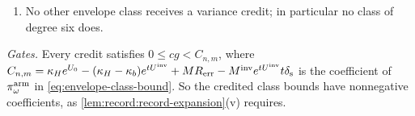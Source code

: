 \begin{lemma}
\begin{enumerate}[label=(\alph*)]
 respectively all matching records equal; weight $2^{1-4}$), $c$ is the cap of the
 envelope on these words, $\kappa_{4,F}:=\kappa_H(\mathrm{F4E0})$ and $\kappa_{4,E}$ the invariant
 cap of the aligned group of E4, and $g=g^{\rm sel}_T(m)$, $T\in\{F,E\}$. A quartic class
 whose envelope is discarded would instead keep the full-norm credit, through
 $-\prod_\Blk\gamma_\Blk\bigotimes_\Blk(I-\Jproj_\Blk)\preceq\bigotimes_\Blk\Delta_\Blk\preceq \prod_\Blk\gamma_\Blk\bigotimes_\Blk(I-\Jproj_\Blk)$, where $\Jproj_\Blk$ is the projection onto constants in the actual half space at $\Blk$, for the centred differences $\Delta_\Blk$ of norms
 $\gamma_\Blk$ (\cref{lem:record:variance-interface}); the two alternatives are never added.
 In the construction neither quartic envelope is discarded.
\item No other envelope class receives a variance credit; in particular no class of
 degree six does.
\end{enumerate}
\emph{Gates.} Every credit satisfies $0\le cg<C_{n,m}$, where
$C_{n,m}=\kappa_He^{U_0}-(\kappa_H-\kappa_b)e^{tU^{\mathrm{inv}}}+MR_{\rm err}-M^{\rm inv}e^{tU^{\mathrm{inv}}}t\delta_{\rm s}$
is the coefficient of $\pi^{\rm arm}_\omega$ in \eqref{eq:envelope-class-bound}. So the credited
class bounds have nonnegative coefficients, as
\cref{lem:record:record-expansion}(v) requires.
\end{lemma}

